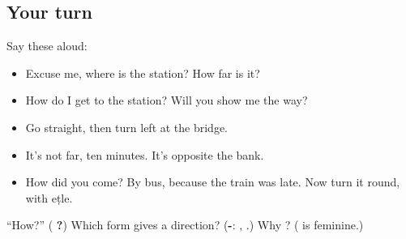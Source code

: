 \subsection*{Your turn}
Say these aloud:

\begin{itemize}
\raggedright
  \item Excuse me, where is the station? How far is it?
  \item How do I get to the station? Will you show me the way?
  \item Go straight, then turn left at the bridge.
  \item It's not far, ten minutes. It's opposite the bank.
  \item How did you come? By bus, because the train was late. Now turn it round, with eṭle.
\end{itemize}

\begin{tcolorbox}[breakable,colback=teal!4,colframe=teal!35!black,title={Before you move on}]
\textquotedblleft{}How?\textquotedblright{} (\textbf{ ?}) Which form gives a direction? (\textbf{-}: \textbf{}, \textbf{}.) Why \textbf{ }? (\textbf{} is feminine.)
\end{tcolorbox}
